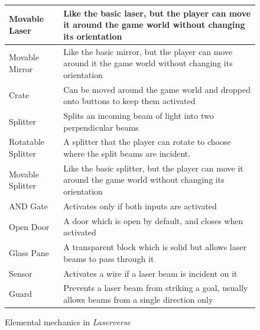 \documentclass[letterpaper]{article}
\begin{document}
\begin{figure}
    \centering
    \begin{tabular}{|l|l|}
        \hline
        Movable Laser      & Like the basic laser, but the player can move it around the game world without changing its
        orientation                                                                                                      \\
        \hline
        Movable Mirror     & Like the basic mirror, but the player can move around it the game world without changing
        its orientation                                                                                                  \\
        \hline
        Crate              & Can be moved around the game world and dropped onto buttons to keep them activated
        \\
        \hline
        Splitter           & Splits an incoming beam of light into two perpendicular beams
        \\
        \hline
        Rotatable Splitter & A splitter that the player can rotate to choose where the split beams are incident.
        \\
        \hline
        Movable Splitter   & Like the basic splitter, but the player can move it around the game world without changing
        its orientation                                                                                                  \\
        \hline
        AND Gate           & Activates only if both inputs are activated
        \\
        \hline
        Open Door          & A door which is open by default, and closes when activated
        \\
        \hline
        Glass Pane         & A transparent block which is solid but allows laser beams to pass through it
        \\
        \hline
        Sensor             & Activates a wire if a laser beam is incident on it
        \\
        \hline
        Guard              & Prevents a laser beam from striking a goal, usually allows beams from a single direction
        only                                                                                                             \\
        \hline
    \end{tabular}
    \caption{Elemental mechanics in \textit{Laserverse}}
    \label{tab:mechanics}
\end{figure}
\end{document}
